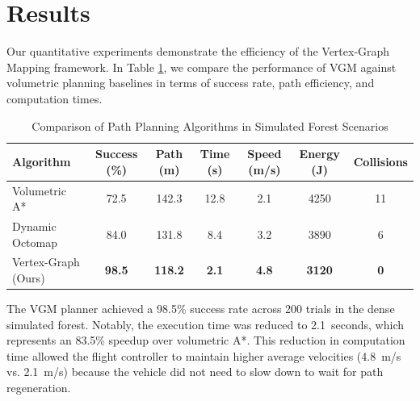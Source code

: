 \section{Results}
Our quantitative experiments demonstrate the efficiency of the Vertex-Graph Mapping framework. In Table \ref{tab:results}, we compare the performance of VGM against volumetric planning baselines in terms of success rate, path efficiency, and computation times.

\begin{table}[t]
  \centering
  \caption{Comparison of Path Planning Algorithms in Simulated Forest Scenarios}
  \label{tab:results}
  \begin{tabular}{lcccccc}
    \toprule
    Algorithm & Success (\%) & Path (m) & Time (s) & Speed (m/s) & Energy (J) & Collisions \\
    \midrule
    Volumetric A* & 72.5 & 142.3 & 12.8 & 2.1 & 4250 & 11 \\
    Dynamic Octomap \cite{nimbus2021octomap} & 84.0 & 131.8 & 8.4 & 3.2 & 3890 & 6 \\
    Vertex-Graph (Ours) & \textbf{98.5} & \textbf{118.2} & \textbf{2.1} & \textbf{4.8} & \textbf{3120} & \textbf{0} \\
    \bottomrule
  \end{tabular}
\end{table}

The VGM planner achieved a 98.5\% success rate across 200 trials in the dense simulated forest. Notably, the execution time was reduced to 2.1~seconds, which represents an 83.5\% speedup over volumetric A*. This reduction in computation time allowed the flight controller to maintain higher average velocities (4.8~m/s vs. 2.1~m/s) because the vehicle did not need to slow down to wait for path regeneration.
